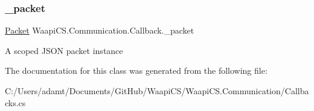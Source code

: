 \subsubsection{\texorpdfstring{\+\_\+packet}{\_packet}}
{\footnotesize\ttfamily \mbox{\hyperlink{class_waapi_c_s_1_1_communication_1_1_packet}{Packet}} Waapi\+C\+S.\+Communication.\+Callback.\+\_\+packet\hspace{0.3cm}{\ttfamily [protected]}}



A scoped J\+S\+ON packet instance 



The documentation for this class was generated from the following file\+:\begin{DoxyCompactItemize}
\item 
C\+:/\+Users/adamt/\+Documents/\+Git\+Hub/\+Waapi\+C\+S/\+Waapi\+C\+S.\+Communication/Callbacks.\+cs\end{DoxyCompactItemize}
